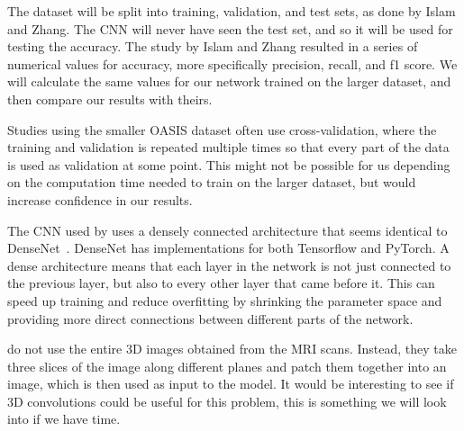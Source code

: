 \documentclass{kththesis}
\begin{document}
The dataset will be split into training, validation, and test sets, as done by Islam and Zhang. The CNN will never have seen the test set, and so it will be used for testing the accuracy. The study by Islam and Zhang resulted in a series of numerical values for accuracy, more specifically precision, recall, and f1 score. We will calculate the same values for our network trained on the larger dataset, and then compare our results with theirs. 

Studies using the smaller OASIS dataset often use cross-validation, where the training and validation is repeated multiple times so that every part of the data is used as validation at some point. This might not be possible for us depending on the computation time needed to train on the larger dataset, but would increase confidence in our results.

The CNN used by \textcite{islam2018early} uses a densely connected architecture that seems identical to DenseNet~\cite{huang2017densely}. DenseNet has implementations for both Tensorflow and PyTorch. A dense architecture means that each layer in the network is not just connected to the previous layer, but also to every other layer that came before it. This can speed up training and reduce overfitting by shrinking the parameter space and providing more direct connections between different parts of the network.

\textcite{islam2018early} do not use the entire 3D images obtained from the MRI scans. Instead, they take three slices of the image along different planes and patch them together into an image, which is then used as input to the model. It would be interesting to see if 3D convolutions could be useful for this problem, this is something we will look into if we have time.
\end{document}
